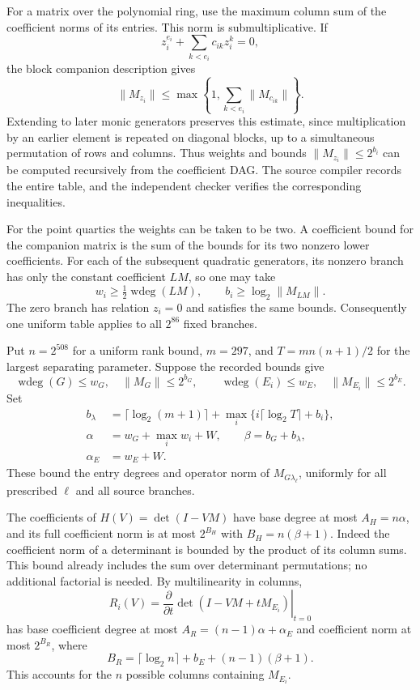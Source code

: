 \documentclass[11pt]{article}
\theoremstyle{definition}
\begin{document}
For a matrix over the polynomial ring, use the maximum column sum of
the coefficient norms of its entries. This norm is submultiplicative.
If
\[
 z_i^{e_i}+\sum_{k<e_i}c_{ik}z_i^k=0,
\]
the block companion description gives
\[
 \|M_{z_i}\|\le
 \max\left\{1,\sum_{k<e_i}\|M_{c_{ik}}\|\right\}.
\]
Extending to later monic generators preserves this estimate, since
multiplication by an earlier element is repeated on diagonal blocks,
up to a simultaneous permutation of rows and columns. Thus weights
and bounds $\|M_{z_i}\|\le2^{b_i}$ can be computed recursively from
the coefficient DAG. The source compiler records the entire table,
and the independent checker verifies the corresponding inequalities.

For the point quartics the weights can be taken to be two. A coefficient
bound for the companion matrix is the sum of the bounds for its two
nonzero lower coefficients. For each of the subsequent quadratic
generators, its nonzero branch has only the constant coefficient
$LM$, so one may take
\[
 w_i\ge\tfrac12\operatorname{wdeg}(LM),\qquad
 b_i\ge\log_2\|M_{LM}\|.
\]
The zero branch has relation $z_i=0$ and satisfies the same bounds.
Consequently one uniform table applies to all $2^{86}$ fixed branches.

Put $n=2^{508}$ for a uniform rank bound, $m=297$, and
$T=m n(n+1)/2$ for the largest separating parameter. Suppose the
recorded bounds give
\[
 \operatorname{wdeg}(G)\le w_G,\quad \|M_G\|\le2^{b_G},\qquad
 \operatorname{wdeg}(E_i)\le w_E,\quad \|M_{E_i}\|\le2^{b_E}.
\]
Set
\begin{align*}
 b_\lambda&=\lceil\log_2(m+1)\rceil
       +\max_i\{i\lceil\log_2 T\rceil+b_i\},\\
 \alpha&=w_G+\max_i w_i+W,\qquad \beta=b_G+b_\lambda,\\
 \alpha_E&=w_E+W.
\end{align*}
These bound the entry degrees and operator norm of
$M_{G\lambda_\ell}$, uniformly for all prescribed $\ell$ and all
source branches.

The coefficients of $H(V)=\det(I-VM)$ have base degree at most
$A_H=n\alpha$, and its full coefficient norm is at most
$2^{B_H}$ with $B_H=n(\beta+1)$. Indeed the coefficient norm of a
determinant is bounded by the product of its column sums. This bound
already includes the sum over determinant permutations; no additional
factorial is needed. By multilinearity in columns,
\[
 R_i(V)=\left.\frac{\partial}{\partial t}
       \det(I-VM+tM_{E_i})\right|_{t=0}
\]
has base coefficient degree at most
$A_R=(n-1)\alpha+\alpha_E$ and coefficient norm at most $2^{B_R}$,
where
\[
 B_R=\lceil\log_2 n\rceil+b_E+(n-1)(\beta+1).
\]
This accounts for the $n$ possible columns containing $M_{E_i}$.
\end{document}
